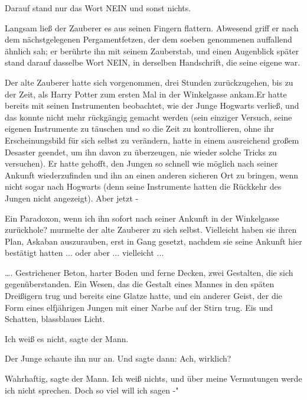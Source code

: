 Darauf stand nur das Wort \glqq{}NEIN\grqq{} und sonst nichts.

Langsam ließ der Zauberer es aus seinen Fingern flattern. Abwesend griff er nach
dem nächstgelegenen Pergamentfetzen, der dem soeben genommenen auffallend
ähnlich sah; er berührte ihn mit seinem Zauberstab, und einen Augenblick später
stand darauf dasselbe Wort \glqq{}NEIN\grqq{}, in derselben Handschrift, die
seine eigene war.

Der alte Zauberer hatte sich vorgenommen, drei Stunden zurückzugehen, bis zu der
Zeit, als Harry Potter zum ersten Mal in der Winkelgasse ankam.Er hatte bereits
mit seinen Instrumenten beobachtet, wie der Junge Hogwarts verließ, und das
konnte nicht mehr rückgängig gemacht werden (sein einziger Versuch, seine
eigenen Instrumente zu täuschen und so die Zeit zu kontrollieren, ohne ihr
Erscheinungsbild für sich selbst zu verändern, hatte in einem ausreichend großem
Desaster geendet, um ihn davon zu überzeugen, nie wieder solche Tricks zu
versuchen). Er hatte gehofft, den Jungen so schnell wie möglich nach seiner
Ankunft wiederzufinden und ihn an einen anderen sicheren Ort zu bringen, wenn
nicht sogar nach Hogwarts (denn seine Instrumente hatten die Rückkehr des Jungen
nicht angezeigt). Aber jetzt -

\glqq{}Ein Paradoxon, wenn ich ihn sofort nach seiner Ankunft in der Winkelgasse
zurückhole?\grqq{} murmelte der alte Zauberer zu sich selbst. \glqq{}Vielleicht
haben sie ihren Plan, Askaban auszurauben, erst in Gang gesetzt, nachdem sie
seine Ankunft hier bestätigt hatten ... oder aber ... vielleicht ...\grqq{}

…. Gestrichener Beton, harter Boden und ferne Decken, zwei Gestalten, die sich
gegenüberstanden. Ein Wesen, das die Gestalt eines Mannes in den späten
Dreißigern trug und bereits eine Glatze hatte, und ein anderer Geist, der die
Form eines elfjährigen Jungen mit einer Narbe auf der Stirn trug. Eis und
Schatten, blassblaues Licht.

\glqq{}Ich weiß es nicht\grqq{}, sagte der Mann.

Der Junge schaute ihn nur an. Und sagte dann: \glqq{}Ach, wirklich?\grqq{}

\glqq{}Wahrhaftig\grqq{}, sagte der Mann. \glqq{}Ich weiß nichts, und über meine
Vermutungen werde ich nicht sprechen. Doch so viel will ich sagen -"

